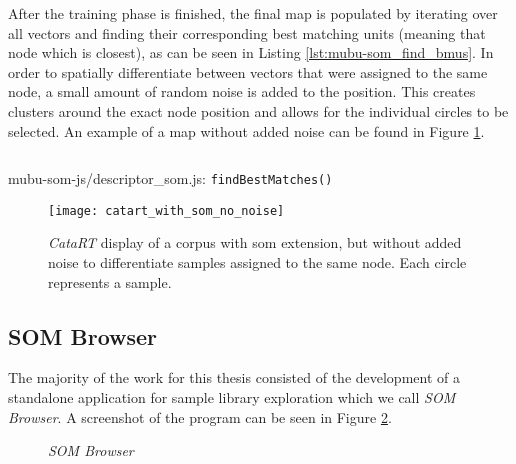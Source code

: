 \smallskip

After the training phase is finished, the final map is populated by iterating
over all vectors and finding their corresponding best matching units (meaning
that node which is closest), as can be seen in Listing
\ref{lst:mubu-som_find_bmus}. In order to spatially differentiate between
vectors that were assigned to the same node, a small amount of random noise is
added to the position. This creates clusters around the exact node position and
allows for the individual circles to be selected. An example of a map without
added noise can be found in Figure \ref{fig:catart_with_som_no_noise}.

\begin{listing}[!htb]
  \begin{mdframed}
    \inputminted[breaklines, numbers=left, firstline=316, lastline=335,
    fontsize=\footnotesize]{js}{../dev/mubu-som-js/descriptor_som.js}
  \end{mdframed}
  \caption{mubu-som-js/descriptor\_som.js: \texttt{findBestMatches()}}
  \label{lst:mubu-som_find_bmus}
\end{listing}

\begin{figure}[!htb]
  \centering
  \texttt{[image: catart\_with\_som\_no\_noise]}
  \caption[\textit{CataRT}: \gls{som} without added noise ]{\textit{CataRT}
  display of a corpus with \gls{som} extension, but without added noise to
  differentiate samples assigned to the same node. Each circle represents a
  sample.}
  \label{fig:catart_with_som_no_noise}
\end{figure}



\clearpage

\subsection{SOM Browser}
\label{subsec:implementation_som-browser}

The majority of the work for this thesis consisted of the development of a
standalone application for sample library exploration which we call
\textit{SOM Browser}. A screenshot of the program can be seen in Figure
\ref{fig:som-browser}.

\begin{figure}[!htb]
  \centering
  \caption{\textit{SOM Browser}}
  \label{fig:som-browser}
\end{figure}

